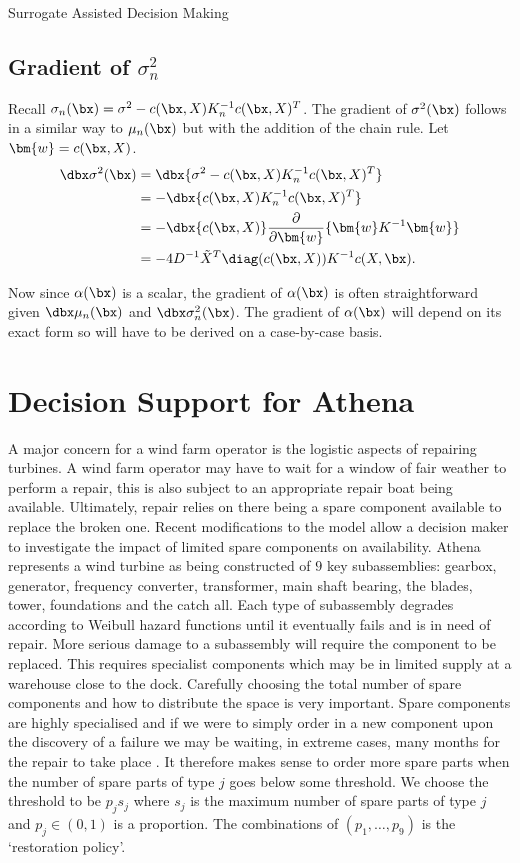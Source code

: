 \begin{chapter}{Surrogate Assisted Decision Making \label{Chap:optimisation}}
\subsection{Gradient of $\sigma_n^2$}

Recall $\sigma_n(\bx) = \sigma^2 - c(\bx, X)K_n^{-1}c(\bx, X)^T$. The gradient of $\sigma^2(\bx)$ follows in a similar way to $\mu_n(\bx)$ but with the addition of the chain rule. Let $\bm{w} = c(\bx, X)$.
\begin{align}
  \dbx \sigma^2(\bx) &= \dbx \{ \sigma^2 - c(\bx, X)K_n^{-1}c(\bx, X)^T \} \nonumber\\
  &=-\dbx \{ c(\bx, X)K_n^{-1}c(\bx, X)^T \} \nonumber\\
  &=- \dbx{c(\bx,X)} \frac{\partial}{\partial \bm{w}}\{ \bm{w} K^{-1} \bm{w} \} \nonumber\\
  &= -4D^{-1} \tilde{X}^T \diag( c(\bx, X))K^{-1}c(X, \bx).
\end{align}

Now since $\alpha(\bx)$ is a scalar, the gradient of $\alpha(\bx)$ is often straightforward given $\dbx \mu_n(\bx)$ and $\dbx \sigma^2_n (\bx)$. The gradient of $\alpha(\bx)$ will depend on its exact form so will have to be derived on a case-by-case basis.

\section{Decision Support for Athena}

A major concern for a wind farm operator is the logistic aspects of repairing turbines. A wind farm operator may have to wait for a window of fair weather to perform a repair, this is also subject to an appropriate repair boat being available. Ultimately, repair relies on there being a spare component available to replace the broken one. Recent modifications to the model allow a decision maker to investigate the impact of limited spare components on availability. Athena represents a wind turbine as being constructed of $9$ key subassemblies: gearbox, generator, frequency converter, transformer, main shaft bearing, the blades, tower, foundations and the catch all. Each type of subassembly degrades according to Weibull hazard functions until it eventually fails and is in need of repair. More serious damage to a subassembly will require the component to be replaced. This requires specialist components which may be in limited supply at a warehouse close to the dock. Carefully choosing the total number of spare components and how to distribute the space is very important. Spare components are highly specialised and if we were to simply order in a new component upon the discovery of a failure we may be waiting, in extreme cases, many months for the repair to take place \citep{Ferdinand2018}. It therefore makes sense to order more spare parts when the number of spare parts of type $j$ goes below some threshold. We choose the threshold to be $p_js_j$ where $s_j$ is the maximum number of spare parts of type $j$ and $p_j \in (0,1)$ is a proportion. The combinations of $(p_1, \ldots, p_9)$ is the `restoration policy'.


\end{chapter}
